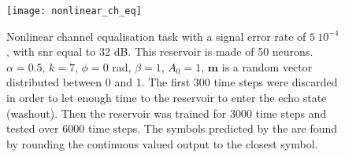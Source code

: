 \begin{figure}[h]
	\centering
	\texttt{[image: nonlinear\_ch\_eq]}
	\caption{Nonlinear channel equalisation task with a signal error rate of $5~10^{-4}$, with \gls{snr} equal to 32 dB. This reservoir is made of 50 neurons. $\alpha=0.5$, $k=7$, $\phi=0$ rad, $\beta=1$, $A_0=1$, $\mathbf{m}$ is a random vector distributed between 0 and 1. The first 300 time steps were discarded in order to let enough time to the reservoir to enter the echo state (washout). Then the reservoir was trained for 3000 time steps and tested over 6000 time steps. The symbols predicted by the \rcer are found by rounding the continuous valued output to the closest symbol.}
\end{figure}
